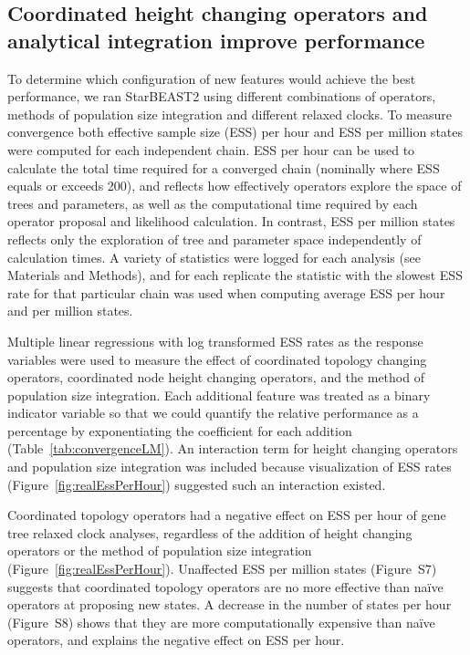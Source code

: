 \documentclass[nogrid]{MBE}%
\begin{document}
\subsection{Coordinated height changing operators and analytical integration improve performance}

To determine which configuration of new features would achieve the best
performance, we ran StarBEAST2 using different combinations of operators,
methods of population size integration and different relaxed clocks. To measure
convergence both effective sample size (ESS) per hour and ESS per million states
were computed for each independent chain. ESS per hour can be used to calculate
the total time required for a converged chain (nominally where ESS equals or
exceeds 200), and reflects how effectively operators explore the space of trees
and parameters, as well as the computational time required by each operator proposal
and likelihood calculation. In contrast, ESS per million states reflects only
the exploration of tree and parameter space independently of calculation times.
A variety of statistics were logged for each analysis (see Materials and Methods), and for
each replicate the statistic with the slowest ESS rate for that particular chain
was used when computing average ESS per hour and per million states.

Multiple linear regressions with log transformed ESS rates as the response
variables were used to measure the effect of coordinated topology changing operators,
coordinated node height changing operators, and the method of population size
integration. Each additional feature was treated as a binary indicator variable
so that we could quantify the relative performance as a percentage by
exponentiating the coefficient for each addition
(Table~\ref{tab:convergenceLM}). An interaction term for height changing
operators and population size integration was included because visualization of
ESS rates (Figure~\ref{fig:realEssPerHour}) suggested such an interaction existed.

Coordinated topology operators had a negative effect on ESS per hour of gene
tree relaxed clock analyses, regardless of the addition of height changing
operators or the method of population size integration
(Figure~\ref{fig:realEssPerHour}). Unaffected ESS per million states
(Figure~S7) suggests that coordinated topology operators are no
more effective than na\"ive operators at proposing new states. A decrease in the
number of states per hour (Figure~S8) shows that they are more computationally
expensive than na\"ive operators, and explains the negative effect on ESS per
hour.
\end{document}
